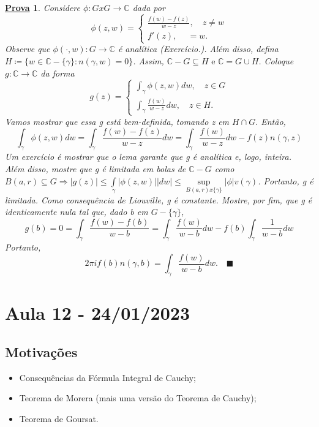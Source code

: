 \documentclass{article}
\newtheorem*{proof*}{\underline{Prova}}
\renewcommand\qedsymbol{$\blacksquare$}
\begin{document}
  \begin{proof*}
    Considere $\phi:GxG\rightarrow \mathbb{C}$ dada por 
    $$
    \phi(z, w) = \left\{\begin{array}{ll}
        \frac{f(w)-f(z)}{w-z}, \quad z\neq{w} \\
        f'(z), \quad \ = w.
    \end{array}\right.
    $$
    Observe que $\phi(\cdot, w):G\rightarrow \mathbb{C}$ \'e anal\'itica (Exerc\'icio.). Al\'em disso, defina
    $H\coloneqq \{w\in{\mathbb{C}-\{\gamma\}}: n(\gamma, w) = 0\}$. Assim, $\mathbb{C}-G\subseteq{H}\text{ e } \mathbb{C} = G\cup{H}$.
    Coloque $g:\mathbb{C}\rightarrow \mathbb{C}$ da forma 
    $$
    g(z) = \left\{\begin{array}{ll}
        \int_{\gamma}^{}\phi(z, w)dw, \quad z\in{G} \\
        \int_{\gamma}^{}\frac{f(w)}{w-z}dw, \quad z\in{H}.
    \end{array}\right.
    $$
    Vamos mostrar que essa g est\'a bem-definida, tomando z em $H\cap{G}.$ Ent\~ao,
    $$
    \int_{\gamma}^{}\phi(z, w)dw = \int_{\gamma}^{}\frac{f(w)-f(z)}{w-z}dw = \int_{\gamma}^{}\frac{f(w)}{w-z}dw - f(z)n(\gamma, z)
    $$
    Um exerc\'icio \'e mostrar que o lema garante que g \'e anal\'itica e, logo, inteira. Al\'em disso, mostre que g \'e limitada em
    bolas de $\mathbb{C}-G$ como $B(a, r)\subseteq{G}\Rightarrow |g(z)|\leq \int\limits_{\gamma}|\phi(z, w)||dw|\leq \sup\limits_{B(a, r)x \{\gamma\} }|\phi|v(\gamma)$.
    Portanto, g \'e limitada. Como consequ\^encia de Liouville, g \'e constante. Mostre, por fim, que g \'e identicamente nula tal que, dado b em
    $G-\{\gamma\}$,
    $$
    g(b) = 0 = \int_{\gamma}^{}\frac{f(w) - f(b)}{w-b} = \int_{\gamma}^{}\frac{f(w)}{w-b}dw - f(b) \int_{\gamma}^{}\frac{1}{w-b}dw
    $$
    Portanto,
    $$
    2\pi if(b)n(\gamma, b) = \int_{\gamma}^{}\frac{f(w)}{w-b}dw. \quad\text{\qedsymbol}
    $$
  \end{proof*}
  \newpage

  \section{Aula 12 - 24/01/2023}
  \subsection{Motiva\c c\~oes}
  \begin{itemize}
    \item Consequ\^encias da F\'ormula Integral de Cauchy;
    \item Teorema de Morera (mais uma vers\~ao do Teorema de Cauchy);
    \item Teorema de Goursat.
  \end{itemize}
\end{document}
